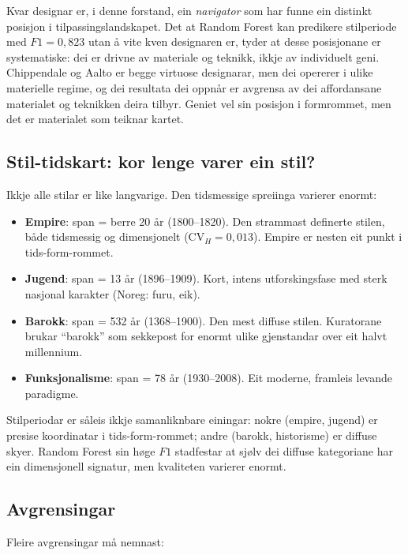 \documentclass[10pt, a4paper, twocolumn]{article}
\begin{document}
Kvar designar er, i denne forstand, ein \emph{navigator} som har funne ein distinkt posisjon i tilpassingslandskapet. Det at Random Forest kan predikere stilperiode med $F1 = 0{,}823$ utan å vite kven designaren er, tyder at desse posisjonane er systematiske: dei er drivne av materiale og teknikk, ikkje av individuelt geni. Chippendale og Aalto er begge virtuose designarar, men dei opererer i ulike materielle regime, og dei resultata dei oppnår er avgrensa av dei affordansane materialet og teknikken deira tilbyr. Geniet vel sin posisjon i formrommet, men det er materialet som teiknar kartet.

\subsection{Stil-tidskart: kor lenge varer ein stil?}

Ikkje alle stilar er like langvarige. Den tidsmessige spreiinga varierer enormt:

\begin{itemize}
  \item \textbf{Empire}: span = berre 20 år (1800--1820). Den strammast definerte stilen, både tidsmessig og dimensjonelt ($\text{CV}_H = 0{,}013$). Empire er nesten eit punkt i tids-form-rommet.
  \item \textbf{Jugend}: span = 13 år (1896--1909). Kort, intens utforskingsfase med sterk nasjonal karakter (Noreg: furu, eik).
  \item \textbf{Barokk}: span = 532 år (1368--1900). Den mest diffuse stilen. Kuratorane brukar ``barokk'' som sekkepost for enormt ulike gjenstandar over eit halvt millennium.
  \item \textbf{Funksjonalisme}: span = 78 år (1930--2008). Eit moderne, framleis levande paradigme.
\end{itemize}

Stilperiodar er såleis ikkje samanliknbare einingar: nokre (empire, jugend) er presise koordinatar i tids-form-rommet; andre (barokk, historisme) er diffuse skyer. Random Forest sin høge $F1$ stadfestar at sjølv dei diffuse kategoriane har ein dimensjonell signatur, men kvaliteten varierer enormt.

\subsection{Avgrensingar}

Fleire avgrensingar må nemnast:
\end{document}
